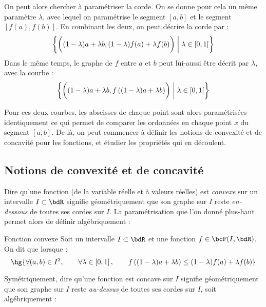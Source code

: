 \documentclass[a4paper,french,bookmarks]{article}
\begin{document}
%
\begin{minipage}{0.5\linewidth}
    On peut alors chercher à paramétriser la corde. On se donne pour cela un même paramètre $\lambda$, avec lequel on paramétrise le segment $[a, b]$ et le segment $[f(a), f(b)]$. En combinant les deux, on peut décrire la corde par :
    \[ \left\{\left(\vphantom{\dfrac{1}{2}}(1-\lambda)a + \lambda b, (1 - \lambda)f(a) + \lambda f(b)\right) \; \middle\vert \; \lambda \in \left[0, 1\right[\right\}\]
    Dans le même temps, le graphe de $f$ entre $a$ et $b$ peut lui-aussi être décrit par $\lambda$, avec la courbe :
    \[ \left\{\left(\vphantom{\dfrac{1}{2}}(1-\lambda)a + \lambda b, f\left((1-\lambda)a + \lambda b\right)\right) \; \middle\vert \; \lambda \in \left[0, 1\right[\right\}\]

\end{minipage}

\hfill

Pour ces deux courbes, les abscisses de chaque point sont alors paramétrisées identiquement ce qui permet de comparer les ordonnées en chaque point $x$ du segment $\left[a, b\right]$. De là, on peut commencer à définir les notions de convexité et de concavité pour les fonctions, et étudier les propriétés qui en découlent.

\subsection{Notions de convexité et de concavité}

Dire qu'une fonction (de la variable réelle et à valeurs réelles) est \textit{convexe} sur un intervalle $I \subset \bdR$ signifie géométriquement que son graphe sur $I$ reste \textit{en-dessous} de toutes ses cordes sur $I$. La paramétrisation que l'on donné plus-haut permet alors de définir algébriquement :

\begin{definition}{Fonction convexe}{}
    Soit un intervalle $I \subset \bdR$ et une fonction $f \in \bcF(I, \bdR)$. On dit que  lorsque :
    \[ \hg{\forall (a, b) \in I^2,\qquad \forall \lambda \in \left[0, 1\right],\qquad f\left((1 - \lambda)a + \lambda b\right) \leq (1-\lambda)f(a) + \lambda f(b)}\]
\end{definition}

Symétriquement, dire qu'une fonction est concave sur $I$ signifie géométriquement que son graphe sur $I$ reste \textit{au-dessus} de toutes ses cordes sur $I$, soit algébriquement :
\end{document}
